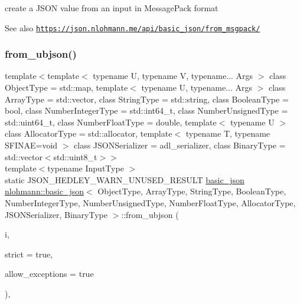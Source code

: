create a J\+S\+ON value from an input in Message\+Pack format 

\begin{DoxySeeAlso}{See also}
\href{https://json.nlohmann.me/api/basic_json/from_msgpack/}{\tt https\+://json.\+nlohmann.\+me/api/basic\+\_\+json/from\+\_\+msgpack/} 
\end{DoxySeeAlso}
\mbox{\label{classnlohmann_1_1basic__json_aa81f62db69978b90ff701f05c72e03a7}} 
\subsubsection{\texorpdfstring{from\+\_\+ubjson()}{from\_ubjson()}\hspace{0.1cm}{\footnotesize\ttfamily [1/2]}}
{\footnotesize\ttfamily template$<$template$<$ typename U, typename V, typename... Args $>$ class Object\+Type = std\+::map, template$<$ typename U, typename... Args $>$ class Array\+Type = std\+::vector, class String\+Type  = std\+::string, class Boolean\+Type  = bool, class Number\+Integer\+Type  = std\+::int64\+\_\+t, class Number\+Unsigned\+Type  = std\+::uint64\+\_\+t, class Number\+Float\+Type  = double, template$<$ typename U $>$ class Allocator\+Type = std\+::allocator, template$<$ typename T, typename S\+F\+I\+N\+A\+E=void $>$ class J\+S\+O\+N\+Serializer = adl\+\_\+serializer, class Binary\+Type  = std\+::vector$<$std\+::uint8\+\_\+t$>$$>$ \\
template$<$typename Input\+Type $>$ \\
static J\+S\+O\+N\+\_\+\+H\+E\+D\+L\+E\+Y\+\_\+\+W\+A\+R\+N\+\_\+\+U\+N\+U\+S\+E\+D\+\_\+\+R\+E\+S\+U\+LT \hyperlink{classnlohmann_1_1basic__json}{basic\+\_\+json} \hyperlink{classnlohmann_1_1basic__json}{nlohmann\+::basic\+\_\+json}$<$ Object\+Type, Array\+Type, String\+Type, Boolean\+Type, Number\+Integer\+Type, Number\+Unsigned\+Type, Number\+Float\+Type, Allocator\+Type, J\+S\+O\+N\+Serializer, Binary\+Type $>$\+::from\+\_\+ubjson (\begin{DoxyParamCaption}\item[{Input\+Type \&\&}]{i,  }\item[{const bool}]{strict = {\ttfamily true},  }\item[{const bool}]{allow\+\_\+exceptions = {\ttfamily true} }\end{DoxyParamCaption})\hspace{0.3cm}{\ttfamily [inline]}, {\ttfamily [static]}}



